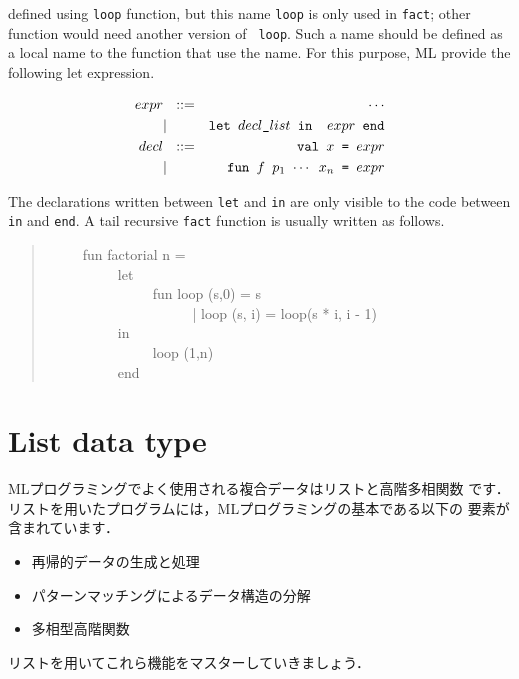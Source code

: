 \documentclass{jbook}
\newcommand{\txt}[2]{#2}
\newcommand{\myem}{\ \ \ \ \  }
\newcommand{\myfm}{ \ \ \ \ \ }
\begin{document}
defined using {\tt loop} function, but this name {\tt loop} is only
used in {\tt fact}; other function would need another version of {\tt
loop}.
	Such a name should be defined as a local name to the function
that use the name.
	For this purpose, ML provide the following let expression.
\begin{tt}
\begin{eqnarray*}
expr &\mbox{\ \ }::=& \cdots \\
     &|& \mbox{\tt let\ $decl\_list$\ in \ $expr$\ end}
\\
decl &\mbox{\ \ }::=& \mbox{\tt val\ $x$ = $expr$}
\\
     &|& \mbox{\tt fun\ $f$\ $p_1$ $\cdots$ $x_n$ =  $expr$}
\end{eqnarray*}
\end{tt}
	The declarations written between 
{\tt let} and {\tt in} are only visible to the code between {\tt in} and
{\tt end}.
	A tail recursive {\tt fact} function is usually written as follows.
\begin{tt}
\begin{quote}
\myem  fun factorial n =
\\\myem\myem    let
\\\myem\myem\myem      fun loop (s,0) = s
\\\myem\myem\myem\myfm        | loop (s, i) = loop(s * i, i - 1)
\\\myem\myem    in
\\\myem\myem\myem      loop (1,n)
\\\myem\myem    end
\end{quote}
\end{tt}
\fi%

\section{\txt{リストデータ型}{List data type}}
\label{sec:tutorialList}

\ifx\jp%
	MLプログラミングでよく使用される複合データはリストと高階多相関数
です．
	リストを用いたプログラムには，MLプログラミングの基本である以下の
要素が含まれています．
\begin{itemize}
\item 
再帰的データの生成と処理
\item 
パターンマッチングによるデータ構造の分解
\item 
多相型高階関数
\end{itemize}
	リストを用いてこれら機能をマスターしていきましょう．
\end{document}
